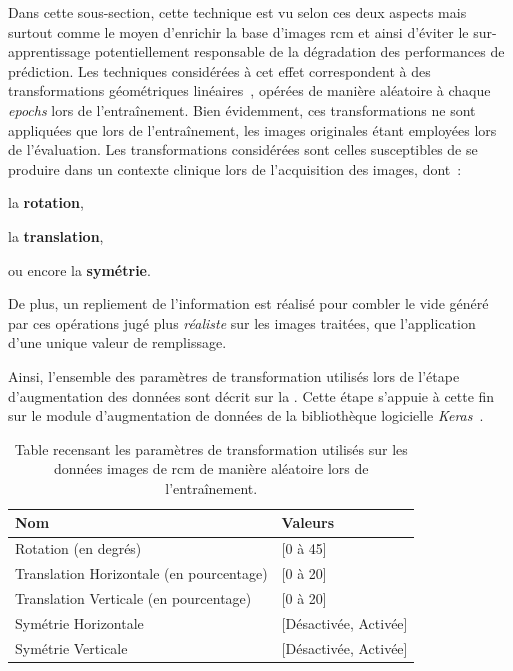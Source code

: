 Dans cette sous-section, cette technique est vu selon ces deux aspects mais surtout comme le moyen d'enrichir la base d'images \gls{rcm} et ainsi d'éviter le sur-apprentissage potentiellement responsable de la dégradation des performances de prédiction. Les techniques considérées à cet effet correspondent à des transformations géométriques linéaires~\cite{Taylor2018}, opérées de manière aléatoire à chaque \textit{epochs} lors de l'entraînement. Bien évidemment, ces transformations ne sont appliquées que lors de l'entraînement, les images originales étant employées lors de l'évaluation. Les transformations considérées sont celles susceptibles de se produire dans un contexte clinique lors de l'acquisition des images, dont~:
\begin{inlinerate}
    \item la \textbf{rotation},
    \item la \textbf{translation},
    \item ou encore la \textbf{symétrie}.
\end{inlinerate} De plus, un repliement de l'information est réalisé pour combler le vide généré par ces opérations jugé plus \textit{réaliste} sur les images traitées, que l'application d'une unique valeur de remplissage.\par

Ainsi, l'ensemble des paramètres de transformation utilisés lors de l'étape d'augmentation des données sont décrit sur la . Cette étape s'appuie à cette fin sur le module d'augmentation de données de la bibliothèque logicielle \textit{Keras}~\cite{chollet2015}.\par

\begin{table}[H]
    \centering
    \begin{tabular}{ll}
        \toprule
        \textbf{Nom}                            & \textbf{Valeurs}      \\ \midrule
        Rotation (en degrés)                    & [0 à 45]              \\ 
        Translation Horizontale (en pourcentage)& [0 à 20]              \\ 
        Translation Verticale (en pourcentage)  & [0 à 20]              \\  
        Symétrie Horizontale                    & [Désactivée, Activée]  \\  
        Symétrie Verticale                      & [Désactivée, Activée]  \\ 
        \bottomrule 
    \end{tabular} 
    \caption{Table recensant les paramètres de transformation utilisés sur les données images de \gls{rcm} de manière aléatoire lors de l'entraînement.}
    \label{tab:parameters_image_improvement_data_augmentation}
\end{table}\par

